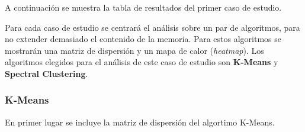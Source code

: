 	A continuación se muestra la tabla de resultados del primer caso de estudio.
	
	\begin{table}[H]
		\centering
		\caption{Resultados de los algoritmos de clustering para el primer caso de estudio.}
	\end{table}

	Para cada caso de estudio se centrará el análisis sobre un par de algoritmos, para no extender demasiado el contenido de la memoria. Para estos algoritmos se mostrarán una matriz de dispersión y un mapa de calor (\textit{heatmap}). Los algoritmos elegidos para el análisis de este caso de estudio son \textbf{K-Means} y \textbf{Spectral Clustering}.
	
	\subsubsection{K-Means}
	En primer lugar se incluye la matriz de dispersión del algortimo K-Means.
	
